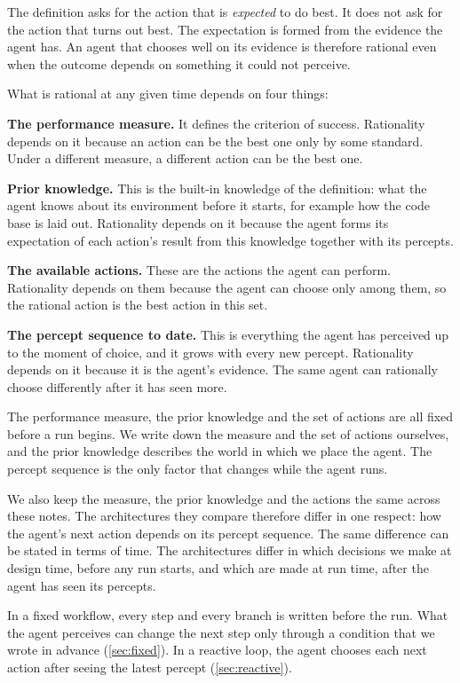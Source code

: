 The definition asks for the action that is \emph{expected} to do best. It does not ask for the
action that turns out best. The expectation is formed from the evidence the agent has. An agent
that chooses well on its evidence is therefore rational even when the outcome depends on something
it could not perceive.

What is rational at any given time depends on four things:
\bi
\item \textbf{The performance measure.} It defines the criterion of success. Rationality depends on
it because an action can be the best one only by some standard. Under a different measure, a
different action can be the best one.
\item \textbf{Prior knowledge.} This is the built-in knowledge of the definition: what the agent
knows about its environment before it starts, for example how the code base is laid out.
Rationality depends on it because the agent forms its expectation of each action's result from this
knowledge together with its percepts.
\item \textbf{The available actions.} These are the actions the agent can perform. Rationality
depends on them because the agent can choose only among them, so the rational action is the best
action in this set.
\item \textbf{The percept sequence to date.} This is everything the agent has perceived up to the
moment of choice, and it grows with every new percept. Rationality depends on it because it is the
agent's evidence. The same agent can rationally choose differently after it has seen more.
\ei

The performance measure, the prior knowledge and the set of actions are all fixed before a run
begins. We write down the measure and the set of actions ourselves, and the prior knowledge
describes the world in which we place the agent. The percept sequence is the only factor that
changes while the agent runs.

We also keep the measure, the prior knowledge and the actions the same across these notes. The
architectures they compare therefore differ in one respect: how the agent's next action
depends on its percept sequence. The same difference can be stated in terms of time. The
architectures differ in which decisions we make at design time, before any run starts, and which
are made at run time, after the agent has seen its percepts.

In a fixed workflow, every step and every branch is written before the run. What the agent
perceives can change the next step only through a condition that we wrote in advance
(\cref{sec:fixed}). In a reactive loop, the agent chooses each next action after seeing the latest
percept (\cref{sec:reactive}).

